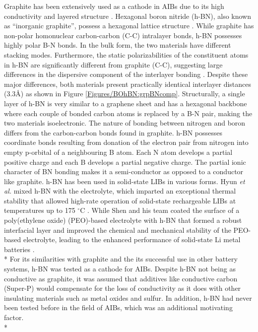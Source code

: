 Graphite has been extensively used as a cathode in AIBs due to its high conductivity and layered structure \cite{lin_ultrafast_2015, rani_fluorinated_2013, wang_advanced_2017, kravchyk_efficient_2017, li_novel_2018}. Hexagonal boron nitride (h-BN), also known as \enquote{inorganic graphite}, possess a hexagonal lattice structure \cite{hod_graphite_2012}. While graphite has non-polar homonuclear carbon-carbon (C-C) intralayer bonds, h-BN possesses highly polar B-N bonds. In the bulk form, the two materials have different stacking modes. Furthermore, the static polarizabilities of the constituent atoms in h-BN are significantly different from graphite (C-C), suggesting large differences in the dispersive component of the interlayer bonding \cite{song_large_2010, zeng_white_2010}. Despite these major differences, both materials present practically identical interlayer distances (3.3\AA) as shown in  Figure \ref{Figures/BOhBN:grpBNcomp}. Structurally, a single layer of h-BN is very similar to a graphene sheet and has a hexagonal backbone where each couple of bonded carbon atoms is replaced by a B-N pair, making the two materials isoelectronic. The nature of bonding between nitrogen and boron differs from the carbon-carbon bonds found in graphite. h-BN possesses coordinate bonds resulting from donation of the electron pair from nitrogen into empty p-orbital of a neighbouring B atom. Each N atom develops a partial positive charge and each B develops a partial negative charge. The partial ionic character of BN bonding makes it a semi-conductor as opposed to a conductor like graphite. h-BN has been used in solid-state LIBs in various forms. Hyun \textit{et al.} mixed h-BN with the electrolyte, which imparted an exceptional thermal stability that allowed high-rate operation of solid-state rechargeable LIBs at temperatures up to 175 $^{\circ}$C \cite{hyun_high-modulus_2019}. While Shen and his team coated the surface of a poly(ethylene oxide) (PEO)-based electrolyte with h-BN that formed a robust interfacial layer and improved the chemical and mechanical stability of the PEO-based electrolyte, leading to the enhanced performance of solid-state Li metal batteries \cite{shen_chemically_2019}. \\*
For its similarities with graphite and the its successful use in other battery systems, h-BN was tested as a cathode for AIBs. Despite h-BN not being as conductive as graphite, it was assumed that additives like conductive carbon (Super-P) would compensate for the loss of conductivity as it does with other insulating materials such as metal oxides and sulfur. In addition, h-BN had never been tested before in the field of AIBs, which was an additional motivating factor.\\* 

